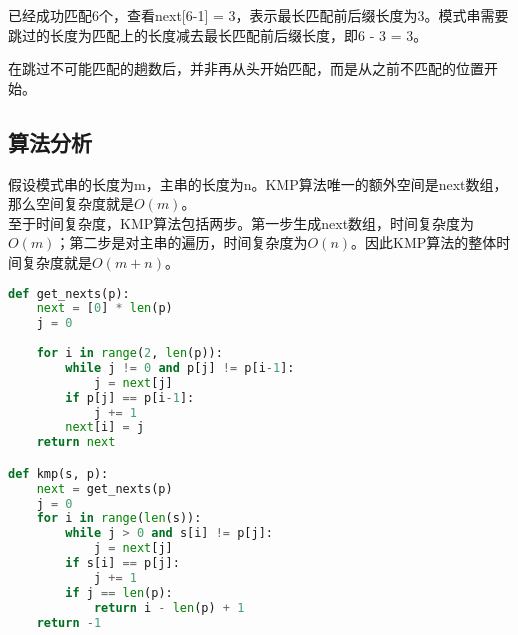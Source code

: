 已经成功匹配6个，查看next[6-1] = 3，表示最长匹配前后缀长度为3。模式串需要跳过的长度为匹配上的长度减去最长匹配前后缀长度，即6 - 3 = 3。

\begin{table}[H]
	\centering
\end{table}

在跳过不可能匹配的趟数后，并非再从头开始匹配，而是从之前不匹配的位置开始。\\

\subsection{算法分析}

假设模式串的长度为m，主串的长度为n。KMP算法唯一的额外空间是next数组，那么空间复杂度就是$ O(m) $。\\

至于时间复杂度，KMP算法包括两步。第一步生成next数组，时间复杂度为$ O(m) $；第二步是对主串的遍历，时间复杂度为$ O(n) $。因此KMP算法的整体时间复杂度就是$ O(m + n) $。\\


\begin{lstlisting}[language=Python]
def get_nexts(p):
    next = [0] * len(p)
    j = 0
    
    for i in range(2, len(p)):
        while j != 0 and p[j] != p[i-1]:
            j = next[j]
        if p[j] == p[i-1]:
            j += 1
        next[i] = j
    return next

def kmp(s, p):
    next = get_nexts(p)
    j = 0
    for i in range(len(s)):
        while j > 0 and s[i] != p[j]:
            j = next[j]
        if s[i] == p[j]:
            j += 1
        if j == len(p):
            return i - len(p) + 1
    return -1
\end{lstlisting}

\newpage